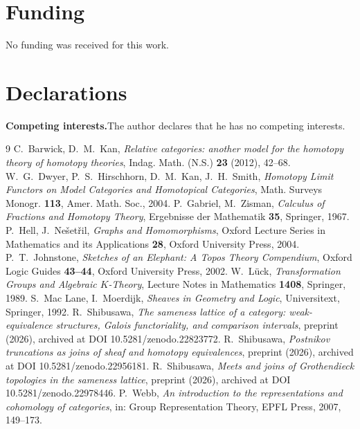 \documentclass[11pt]{amsart}
\theoremstyle{definition}
\begin{document}
\section*{Funding}
No funding was received for this work.

\section*{Declarations}
\noindent\textbf{Competing interests.}\quad The author declares that he has no
competing interests.

\begin{thebibliography}{9}
 C.~Barwick, D.~M.~Kan, \emph{Relative categories: another model
for the homotopy theory of homotopy theories}, Indag. Math. (N.S.)
\textbf{23} (2012), 42--68.
 W.~G.~Dwyer, P.~S.~Hirschhorn, D.~M.~Kan, J.~H.~Smith,
\emph{Homotopy Limit Functors on Model Categories and Homotopical
Categories}, Math. Surveys Monogr. \textbf{113}, Amer. Math. Soc., 2004.
 P.~Gabriel, M.~Zisman, \emph{Calculus of Fractions and Homotopy
Theory}, Ergebnisse der Mathematik \textbf{35}, Springer, 1967.
 P.~Hell, J.~Ne\v set\v ril, \emph{Graphs and Homomorphisms},
Oxford Lecture Series in Mathematics and its Applications \textbf{28},
Oxford University Press, 2004.
 P.~T.~Johnstone, \emph{Sketches of an Elephant: A Topos
Theory Compendium}, Oxford Logic Guides \textbf{43--44}, Oxford University
Press, 2002.
 W.~L\"uck, \emph{Transformation Groups and Algebraic
$K$-Theory}, Lecture Notes in Mathematics \textbf{1408}, Springer, 1989.
 S.~Mac Lane, I.~Moerdijk, \emph{Sheaves in Geometry and Logic},
Universitext, Springer, 1992.
 R.~Shibusawa, \emph{The sameness lattice of a category:
weak-equivalence structures, Galois functoriality, and comparison intervals},
preprint (2026), archived at DOI 10.5281/zenodo.22823772.
 R.~Shibusawa, \emph{Postnikov truncations as joins of
sheaf and homotopy equivalences}, preprint (2026), archived at DOI
10.5281/zenodo.22956181.
 R.~Shibusawa, \emph{Meets and joins of Grothendieck
topologies in the sameness lattice}, preprint (2026), archived at DOI
10.5281/zenodo.22978446.
 P.~Webb, \emph{An introduction to the representations and
cohomology of categories}, in: Group Representation Theory, EPFL Press,
2007, 149--173.
\end{thebibliography}
\end{document}
